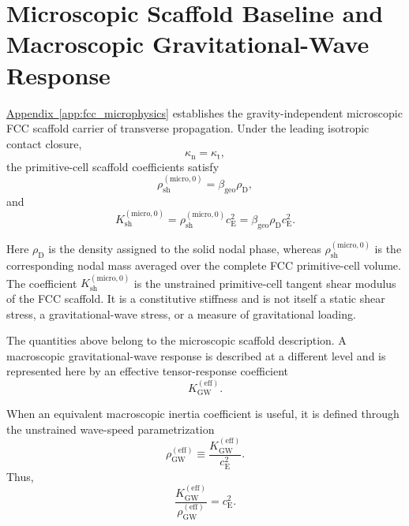 \section{Microscopic Scaffold Baseline and Macroscopic Gravitational-Wave Response}

\hyperref[app:fcc_microphysics]{Appendix~\ref*{app:fcc_microphysics}} establishes the gravity-independent microscopic FCC scaffold carrier of transverse propagation. Under the leading isotropic contact closure,
\begin{equation}
    \kappa_{\mathrm{n}}=\kappa_{\mathrm{t}},
\end{equation}
the primitive-cell scaffold coefficients satisfy
\begin{equation}
    \rho_{\mathrm{sh}}^{(\mathrm{micro},0)} = \beta_{\mathrm{geo}}\rho_{\mathrm{D}},
\end{equation}
and
\begin{equation}
    K_{\mathrm{sh}}^{(\mathrm{micro},0)} = \rho_{\mathrm{sh}}^{(\mathrm{micro},0)}c_{\mathrm{E}}^2 = \beta_{\mathrm{geo}}\rho_{\mathrm{D}}c_{\mathrm{E}}^2.
\end{equation}

Here $\rho_{\mathrm{D}}$ is the density assigned to the solid nodal phase, whereas $\rho_{\mathrm{sh}}^{(\mathrm{micro},0)}$ is the corresponding nodal mass averaged over the complete FCC primitive-cell volume. The coefficient $K_{\mathrm{sh}}^{(\mathrm{micro},0)}$ is the unstrained primitive-cell tangent shear modulus of the FCC scaffold. It is a constitutive stiffness and is not itself a static shear stress, a gravitational-wave stress, or a measure of gravitational loading.

The quantities above belong to the microscopic scaffold description. A macroscopic gravitational-wave response is described at a different level and is represented here by an effective tensor-response coefficient
\begin{equation}
    K_{\mathrm{GW}}^{(\mathrm{eff})}.
\end{equation}

When an equivalent macroscopic inertia coefficient is useful, it is defined through the unstrained wave-speed parametrization
\begin{equation}
    \rho_{\mathrm{GW}}^{(\mathrm{eff})} \equiv \frac{ K_{\mathrm{GW}}^{(\mathrm{eff})} }{ c_{\mathrm{E}}^2 }.
\end{equation}
Thus,
\begin{equation}
    \frac{ K_{\mathrm{GW}}^{(\mathrm{eff})} }{ \rho_{\mathrm{GW}}^{(\mathrm{eff})} } = c_{\mathrm{E}}^2.
\end{equation}

